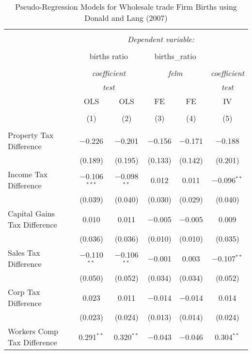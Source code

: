 
\begin{table}[!htbp] \centering 
  \caption{Pseudo-Regression Models for  Wholesale trade Firm Births using Donald and Lang (2007)} 
  \label{} 
\begin{tabular}{@{\extracolsep{5pt}}lccccc} 
\\[-1.8ex]\hline 
\hline \\[-1.8ex] 
 & \multicolumn{5}{c}{\textit{Dependent variable:}} \\ 
\cline{2-6} 
\\[-1.8ex] & \multicolumn{2}{c}{births ratio} & \multicolumn{2}{c}{births\_ratio} &   \\ 
\\[-1.8ex] & \multicolumn{2}{c}{\textit{coefficient}} & \multicolumn{2}{c}{\textit{felm}} & \textit{coefficient} \\ 
 & \multicolumn{2}{c}{\textit{test}} & \multicolumn{2}{c}{\textit{}} & \textit{test} \\ 
 & OLS & OLS & FE & FE & IV \\ 
\\[-1.8ex] & (1) & (2) & (3) & (4) & (5)\\ 
\hline \\[-1.8ex] 
 Property Tax Difference & $-$0.226 & $-$0.201 & $-$0.156 & $-$0.171 & $-$0.188 \\ 
  & (0.189) & (0.195) & (0.133) & (0.142) & (0.201) \\ 
  Income Tax Difference & $-$0.106$^{***}$ & $-$0.098$^{**}$ & 0.012 & 0.011 & $-$0.096$^{**}$ \\ 
  & (0.039) & (0.040) & (0.030) & (0.029) & (0.040) \\ 
  Capital Gains Tax Difference & 0.010 & 0.011 & $-$0.005 & $-$0.005 & 0.009 \\ 
  & (0.036) & (0.036) & (0.010) & (0.010) & (0.035) \\ 
  Sales Tax Difference & $-$0.110$^{**}$ & $-$0.106$^{**}$ & $-$0.001 & 0.003 & $-$0.107$^{**}$ \\ 
  & (0.050) & (0.052) & (0.034) & (0.034) & (0.052) \\ 
  Corp Tax Difference & 0.023 & 0.011 & $-$0.014 & $-$0.014 & 0.014 \\ 
  & (0.023) & (0.024) & (0.013) & (0.014) & (0.024) \\ 
  Workers Comp Tax Difference & 0.291$^{**}$ & 0.320$^{**}$ & $-$0.043 & $-$0.046 & 0.304$^{**}$ \\ 

\end{tabular}
\end{table}
